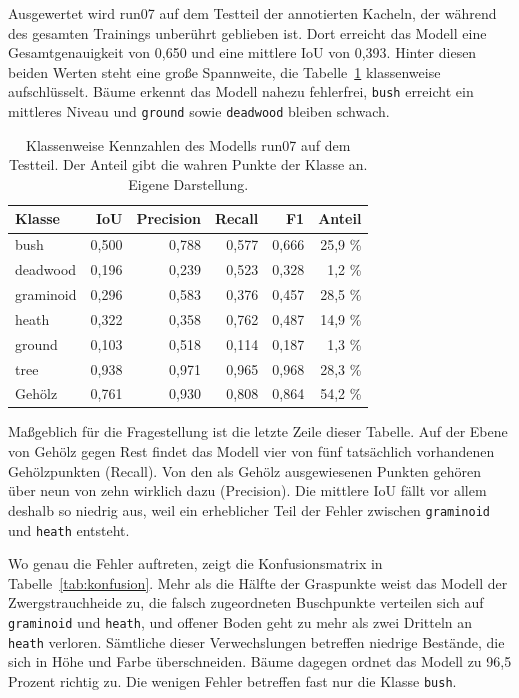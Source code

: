 Ausgewertet wird run07 auf dem Testteil der annotierten Kacheln, der während
des gesamten Trainings unberührt geblieben ist. Dort erreicht das Modell eine
Gesamtgenauigkeit von 0,650 und eine mittlere IoU von 0,393. Hinter diesen
beiden Werten steht eine große Spannweite, die Tabelle~\ref{tab:metriken}
klassenweise aufschlüsselt. Bäume erkennt das Modell nahezu fehlerfrei,
\texttt{bush} erreicht ein mittleres Niveau und \texttt{ground} sowie
\texttt{deadwood} bleiben schwach.

\begin{table}[H]
    \centering
    \caption[Klassenweise Kennzahlen des Modells run07]{Klassenweise Kennzahlen
    des Modells run07 auf dem Testteil. Der Anteil gibt die wahren Punkte der
    Klasse an. Eigene Darstellung.}
    \label{tab:metriken}
    \begin{tabular}{lrrrrr}
    \hline
    Klasse & IoU & Precision & Recall & F1 & Anteil \\
    \hline
    bush      & 0,500 & 0,788 & 0,577 & 0,666 & 25,9 \% \\
    deadwood  & 0,196 & 0,239 & 0,523 & 0,328 & 1,2 \%  \\
    graminoid & 0,296 & 0,583 & 0,376 & 0,457 & 28,5 \% \\
    heath     & 0,322 & 0,358 & 0,762 & 0,487 & 14,9 \% \\
    ground    & 0,103 & 0,518 & 0,114 & 0,187 & 1,3 \%  \\
    tree      & 0,938 & 0,971 & 0,965 & 0,968 & 28,3 \% \\
    \hline
    Gehölz    & 0,761 & 0,930 & 0,808 & 0,864 & 54,2 \% \\
    \hline
    \end{tabular}
\end{table}

Maßgeblich für die Fragestellung ist die letzte Zeile dieser Tabelle. Auf
der Ebene von Gehölz gegen Rest findet das Modell vier von fünf tatsächlich
vorhandenen Gehölzpunkten (Recall). Von den als Gehölz ausgewiesenen Punkten gehören über neun von zehn wirklich dazu (Precision). Die mittlere IoU fällt vor allem deshalb so niedrig aus, weil ein erheblicher Teil der Fehler zwischen \texttt{graminoid} und \texttt{heath} entsteht.

Wo genau die Fehler auftreten, zeigt die Konfusionsmatrix in Tabelle~\ref{tab:konfusion}. Mehr als die Hälfte der Graspunkte weist das Modell der Zwergstrauchheide zu, die falsch zugeordneten Buschpunkte verteilen sich auf \texttt{graminoid} und \texttt{heath}, und offener Boden geht zu mehr als zwei Dritteln an \texttt{heath} verloren. Sämtliche dieser Verwechslungen betreffen niedrige Bestände, die sich in Höhe und Farbe überschneiden. Bäume dagegen ordnet das Modell zu 96,5 Prozent richtig zu. Die wenigen Fehler betreffen fast nur die Klasse \texttt{bush}.

